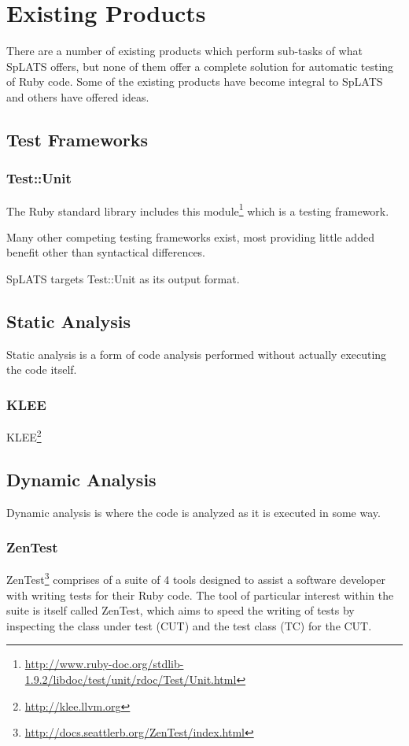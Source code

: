 \chapter{Existing Products}

There are a number of existing products which perform sub-tasks of what SpLATS offers, but none of them offer a complete solution for automatic testing of Ruby code. Some of the existing products have become integral to SpLATS and others have offered ideas.

\section{Test Frameworks}

  \subsection{Test::Unit}
    The Ruby standard library includes this
module\footnote{\url{http://www.ruby-doc.org/stdlib-1.9.2/libdoc/test/unit/rdoc/Test/Unit.html}}
which is a testing framework.

Many other competing testing frameworks exist, most providing little added
benefit other than syntactical differences.

SpLATS targets Test::Unit as its output format.

\section{Static Analysis}

  Static analysis is a form of code analysis performed without actually executing the code itself.

  \subsection{KLEE}
    KLEE\footnote{\url{http://klee.llvm.org}}

\section{Dynamic Analysis} 

  Dynamic analysis is where the code is analyzed as it is executed in some way.

  \subsection{ZenTest}
    ZenTest\footnote{\url{http://docs.seattlerb.org/ZenTest/index.html}}
comprises of a suite of 4 tools designed to assist a software developer with
writing tests for their Ruby code. The tool of particular interest within the suite is itself called ZenTest,
which aims to speed the writing of tests by inspecting the class under test (CUT)
and the test class (TC) for the CUT.

